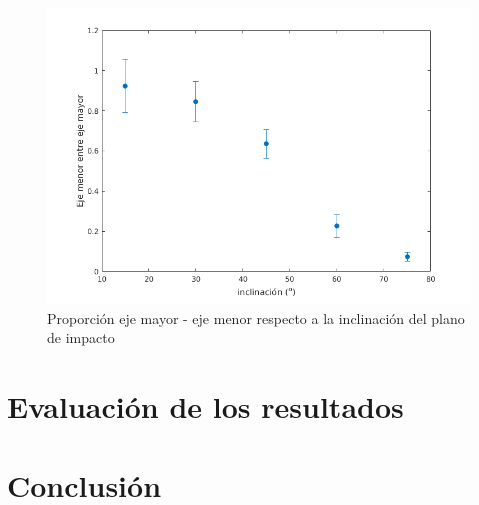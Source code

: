 \begin{figure}[H] \centering
\includegraphics[width=0.9\linewidth]{src/ejes_vsheight.png}
\caption{Proporción eje mayor - eje menor respecto a la inclinación del plano
de impacto} \label{fig:ejes_inclinacion} \end{figure}



\section{Evaluación de los resultados} \label{sec:evaluacion}







\section{Conclusión} \label{sec:conclusion}


\pagebreak \printbibliography[heading=bibintoc,title={Bibliografía}]


